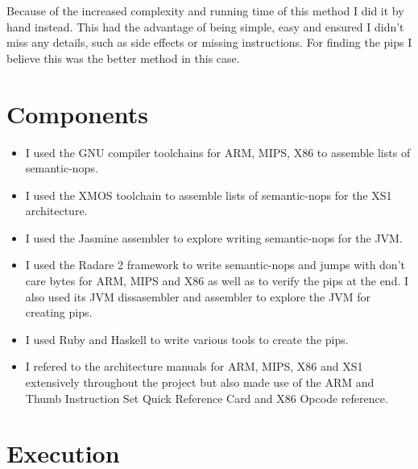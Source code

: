 \documentclass[]{book}
\begin{document}
Because of the increased complexity and running time of this method I
did it by hand instead. This had the advantage of being simple, easy and
ensured I didn't miss any details, such as side effects or missing
instructions. For finding the pips I believe this was the better method
in this case.

\chapter{Components}

\begin{itemize}
\item
  I used the GNU compiler toolchains for ARM, MIPS, X86 to assemble
  lists of semantic-nops.
\item
  I used the XMOS toolchain to assemble lists of semantic-nops for the
  XS1 architecture.
\item
  I used the Jasmine assembler to explore writing semantic-nops for the
  JVM.
\item
  I used the Radare 2 framework to write semantic-nops and jumps with
  don't care bytes for ARM, MIPS and X86 as well as to verify the pips
  at the end. I also used its JVM dissasembler and assembler to explore
  the JVM for creating pips.
\item
  I used Ruby and Haskell to write various tools to create the pips.
\item
  I refered to the architecture manuals for ARM,
  MIPS\autocite{MIPSTechnologiesInc:2011ta}, X86 and XS1 extensively
  throughout the project but also made use of the ARM and Thumb
  Instruction Set Quick Reference Card\autocite{Limited:vc} and X86
  Opcode reference\autocite{refx86}.
\end{itemize}
\chapter{Execution}

\printbibliography[title=Conclusion]
\end{document}
